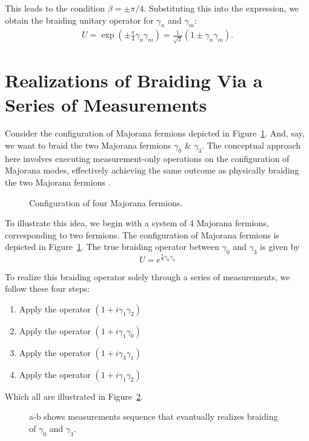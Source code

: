 \documentclass{article}
\begin{document}
This leads to the condition $ \beta = \pm \pi / 4 $. Substituting this into the expression, we obtain the braiding unitary operator for $ \gamma_n $ and $ \gamma_m $:
$$
	\begin{aligned}
		U = \exp \left( \pm \frac{\pi}{4} \gamma_n \gamma_m\right) = \frac{1}{\sqrt{2}}\left(1 \pm \gamma_n \gamma_m\right).
	\end{aligned}
$$

\section{Realizations of Braiding Via a Series of Measurements} %
\label{sec:Realizations of Braiding Via a Series of Measurements}

Consider the configuration of Majorana fermions depicted in Figure~\ref{fig:4 mf conf}. And, say, we want to braid the two Majorana fermions $ \gamma_0 $ \& $ \gamma_3 $. The conceptual approach here involves executing measurement-only operations on the configuration of Majorana modes, effectively achieving the same outcome as physically braiding the two Majorana fermions \cite{Leijnse_2012}.

\begin{figure}
	\begin{center}
		
	\end{center}
	\caption{Configuration of four Majorana fermions.}
	\label{fig:4 mf conf}
\end{figure}

To illustrate this idea, we begin with a system of 4 Majorana fermions, corresponding to two fermions. The configuration of Majorana fermions is depicted in Figure~\ref{fig:4 mf conf}. The true braiding operator between $\gamma_0$ and $\gamma_3$ is given by
\begin{equation}
	U = e^{\frac{\pi}{4} \gamma_0 \gamma_3}
	\label{eq:braiding op}
\end{equation}

To realize this braiding operator solely through a series of measurements, we follow these four steps:

\begin{enumerate}
	\item Apply the operator $ (1 + i \gamma_1 \gamma_2) $
	\item Apply the operator $ (1 + i \gamma_1 \gamma_0) $
	\item Apply the operator $ (1 + i \gamma_3 \gamma_1) $
	\item Apply the operator $ (1 + i \gamma_1 \gamma_2) $
\end{enumerate}
Which all are illustrated in Figure~\ref{fig:meas 4 mfs}.
\begin{figure}
	\begin{center}
		
	\end{center}
	\caption{a-b shows measurements sequence that evantually realizes braiding of $ \gamma_0 $ and $ \gamma_3 $.}
	\label{fig:meas 4 mfs}
\end{figure}
\end{document}
